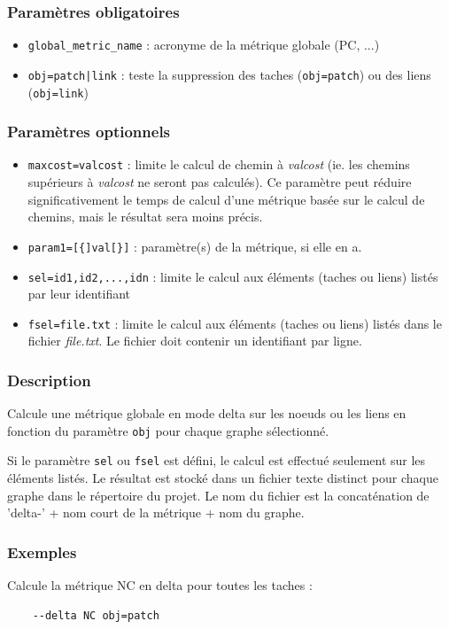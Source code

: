 \documentclass[a4paper,10pt]{report}
\begin{document}
\subsubsection{Paramètres obligatoires}
\begin{itemize}
	\item \verb|global_metric_name| : acronyme de la métrique globale (PC, ...)
	\item \verb+obj=patch|link+ : teste la suppression des taches (\verb+obj=patch+) ou des liens (\verb+obj=link+)
\end{itemize}

\subsubsection{Paramètres optionnels}
\begin{itemize}
	\item \verb|maxcost=valcost| : limite le calcul de chemin à \textit{valcost} (ie. les chemins supérieurs à \textit{valcost} ne seront pas calculés). Ce paramètre peut réduire significativement le temps de calcul d'une métrique basée sur le calcul de chemins, mais le résultat sera moins précis.
	\item \verb|param1=[{]val[}]| : paramètre(s) de la métrique, si elle en a.
	\item \verb|sel=id1,id2,...,idn| : limite le calcul aux éléments (taches ou liens) listés par leur identifiant
	\item \verb|fsel=file.txt| : limite le calcul aux éléments (taches ou liens) listés dans le fichier \textit{file.txt}. Le fichier doit contenir un identifiant par ligne.
\end{itemize}

\subsubsection{Description}
Calcule une métrique globale en mode delta sur les noeuds ou les liens en fonction du paramètre \verb|obj| pour chaque graphe sélectionné.

Si le paramètre \verb|sel| ou \verb|fsel| est défini, le calcul est effectué seulement sur les éléments listés.
Le résultat est stocké dans un fichier texte distinct pour chaque graphe dans le répertoire du projet.
Le nom du fichier est la concaténation de 'delta-' + nom court de la métrique + nom du graphe.

\subsubsection{Exemples}
Calcule la métrique NC en delta pour toutes les taches :
\begin{Verbatim}
	--delta NC obj=patch
\end{Verbatim}
\end{document}
